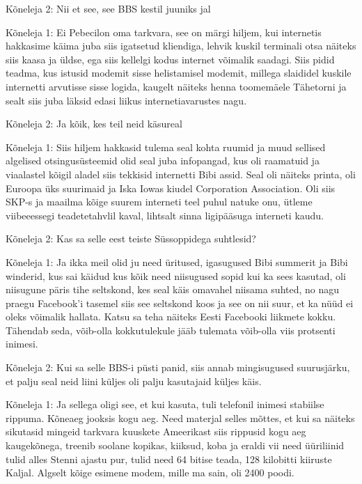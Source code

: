 Kõneleja 2:
Nii et see, see BBS kestil juuniks jal
                 
Kõneleja 1:
Ei Pebecilon oma tarkvara, see on märgi hiljem, kui internetis hakkasime käima juba siis igatsetud kliendiga, lehvik kuskil terminali otsa näiteks siis kaasa ja üldse, ega siis kellelgi kodus internet võimalik saadagi. Siis pidid teadma, kus istusid modemit sisse helistamisel modemit, millega slaididel kuskile internetti arvutisse sisse logida, kaugelt näiteks henna toomemäele Tähetorni ja sealt siis juba läksid edasi liikus internetiavarustes nagu.
                 
Kõneleja 2:
Ja kõik, kes teil neid käsureal
                 
Kõneleja 1:
Siis hiljem hakkasid tulema seal kohta ruumid ja muud sellised algelised otsingusüsteemid olid seal juba infopangad, kus oli raamatuid ja viaalastel kõigil aladel siis tekkisid internetti Bibi assid. Seal oli näiteks printa, oli Euroopa üks suurimaid ja Iska Iowas kiudel Corporation Association. Oli siis SKP-s ja maailma kõige suurem interneti teel puhul natuke onu, ütleme viibeeessegi teadetetahvlil kaval, lihtsalt sinna ligipääsuga interneti kaudu.
                 
Kõneleja 2:
Kas sa selle eest teiste Süssoppidega suhtlesid?
                 
Kõneleja 1:
Ja ikka meil olid ju need üritused, igasugused Bibi summerit ja Bibi winderid, kus sai käidud kus kõik need niisugused sopid kui ka sees kasutad, oli niisugune päris tihe seltskond, kes seal käis omavahel niisama suhted, no nagu praegu Facebook'i tasemel siis see seltskond koos ja see on nii suur, et ka nüüd ei oleks võimalik hallata. Katsu sa teha näiteks Eesti Facebooki liikmete kokku. Tähendab seda, võib-olla kokkutulekule jääb tulemata võib-olla viis protsenti inimesi.
                 
Kõneleja 2:
Kui sa selle BBS-i püsti panid, siis annab mingisugused suurusjärku, et palju seal neid liini küljes oli palju kasutajaid küljes käis.
                 
Kõneleja 1:
Ja sellega oligi see, et kui kasuta, tuli telefonil inimesi stabiilse rippuma. Kõneaeg jooksis kogu aeg. Need materjal selles mõttes, et kui sa näiteks sikutasid mingeid tarkvara kuuskete Ameerikast siis rippusid kogu aeg kaugekõnega, treenib soolane kopikas, kiiksud, koba ja eraldi vii need üüriliinid tulid alles Stenni ajastu pur, tulid need 64 bitise teada, 128 kilobitti kiiruste Kaljal. Algselt kõige esimene modem, mille ma sain, oli 2400 poodi.
                 
